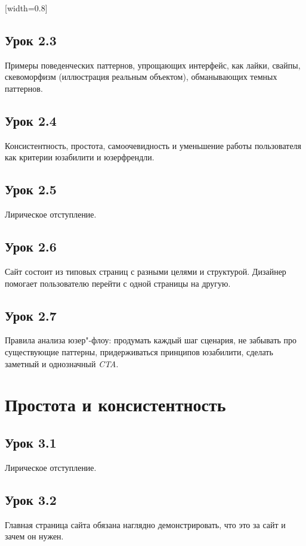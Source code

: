 \documentclass[variant=practice]{bsuir}
\begin{document}
[width=0.8\textwidth]

\subsection{Урок 2.3} Примеры поведенческих паттернов, упрощающих интерфейс, как
лайки, свайпы, скевоморфизм (иллюстрация реальным объектом), обманывающих темных
паттернов.

\subsection{Урок 2.4} Консистентность, простота, самоочевидность и уменьшение
работы пользователя как критерии юзабилити и юзерфрендли.

\subsection{Урок 2.5} Лирическое отступление.

\subsection{Урок 2.6} Сайт состоит из типовых страниц с разными целями и
структурой. Дизайнер помогает пользователю перейти с одной страницы на другую.

\subsection{Урок 2.7} Правила анализа юзер"-флоу: продумать каждый шаг сценария,
не забывать про существующие паттерны, придерживаться принципов юзабилити,
сделать заметный и однозначный \textit{CTA}.

\section{Простота и консистентность}

\subsection{Урок 3.1} Лирическое отступление.

\subsection{Урок 3.2} Главная страница сайта обязана наглядно демонстрировать,
что это за сайт и зачем он нужен.
\end{document}

